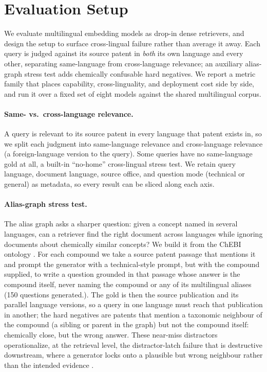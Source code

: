 \section{Evaluation Setup}
\label{sec:setup}

We evaluate multilingual embedding models as drop-in dense retrievers, and design
the setup to surface cross-lingual failure rather than average it away. Each query
is judged against its source patent in \emph{both} its own language and every
other, separating same-language from cross-language relevance; an auxiliary
alias-graph stress test adds chemically confusable hard negatives. We report a
metric family that places capability, cross-linguality, and deployment cost side
by side, and run it over a fixed set of eight models against the shared
multilingual corpus.

\paragraph{Same- vs.\ cross-language relevance.}
A query is relevant to its source patent in every language that patent
exists in, so we split each judgment into same-language relevance and cross-language relevance
(a foreign-language version to the query). Some
queries have no same-language gold at all, a built-in ``no-home'' cross-lingual stress test. We retain query
language, document language, source office, and question mode (technical or
general) as metadata, so every result can be sliced along each axis.

\paragraph{Alias-graph stress test.}
The alias graph asks a sharper question: given a concept named in several
languages, can a retriever find the right document across languages while
ignoring documents about chemically similar concepts? We build it from the ChEBI
ontology \citep{chebi2016}. For each compound we take a source patent passage
that mentions it and prompt the generator with a technical-style prompt, but with
the compound supplied, to write a question grounded in that passage whose answer
is the compound itself, never naming the compound or any of its multilingual
aliases (150 questions generated.). The gold is then the source publication and its parallel language
versions, so a query in one language must reach that publication in another;
the hard negatives are patents that mention a taxonomic neighbour of the compound
(a sibling or parent in the graph) but not the compound itself: chemically close,
but the wrong answer. These near-miss distractors operationalize, at the
retrieval level, the distractor-latch failure that is destructive downstream,
where a generator locks onto a plausible but wrong neighbour rather than the
intended evidence \citep{astaraki2026iterativerag}.


